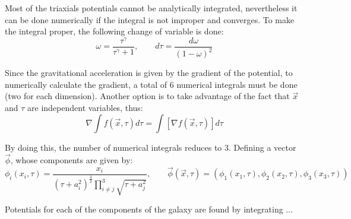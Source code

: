 	Most of the triaxials potentials cannot be analytically integrated, nevertheless it can be done numerically if the integral is not improper and converges. To make the integral proper, the following change of variable is done:
	\begin{equation}
		\omega = \dfrac{\tau^\gamma}{\tau^\gamma + 1}, \qquad d\tau = \dfrac{d\omega}{(1 - \omega)^2}
	\end{equation} 
	
	Since the gravitational acceleration is given by the gradient of the potential, to numerically calculate the gradient, a total of 6 numerical integrals must be done (two for each dimension). Another option is to take advantage of the fact that $\vec{x}$ and $\tau$ are independent variables, thus:
	\begin{equation}
		\nabla \int f(\vec{x}, \tau)d\tau = \int [\nabla f(\vec{x}, \tau)] d\tau
	\end{equation}
	
	By doing this, the number of numerical integrals reduces to 3. Defining a vector $\vec{\phi}$, whose components are given by:
	\begin{equation}
		\phi_i(x_i, \tau) = \dfrac{x_i}{\left(\tau + a_i^2\right)^{\frac{3}{2}} \prod\limits_{i \neq j}^3\sqrt{\tau + a_j^2}}, \qquad \vec{\phi}(\vec{x}, \tau) = (\phi_1(x_1, \tau), \phi_2(x_2, \tau), \phi_3(x_3, \tau))
	\end{equation}
	
	Potentials for each of the components of the galaxy are found by integrating ...
	
